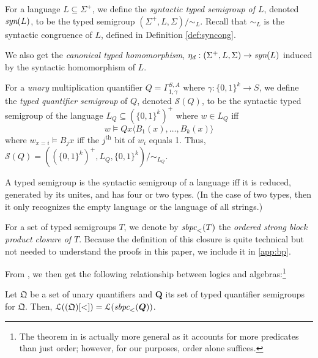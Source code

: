 \documentclass[a4paper,UKenglish,cleveref, autoref, thm-restate, anonymous]{lipics-v2021}
\begin{document}
\begin{definition}
    For a language $L \subseteq \Sigma^+$, we define the \emph{syntactic typed semigroup of $L$}, denoted $\emph{syn}(L)$, to be the typed semigroup $(\Sigma^+, L, \Sigma)/{\sim_L}$. Recall that ${\sim_L}$ is the syntactic congruence of $L$, defined in Definition \ref{def:syncong}.

    We also get the \emph{canonical typed homomorphism}, $\eta_d : (\Sigma^+, L, \Sigma) \rightarrow \emph{syn}(L)$ induced by the syntactic homomorphism of $L$.
\end{definition} 


\begin{definition}\label{def:origtypedquantsemi}
    For a \emph{unary} multiplication quantifier $Q = \Gamma^{S,A}_{1,\gamma}$ where $\gamma : \{0,1\}^k \rightarrow S$, we define the \emph{typed quantifier semigroup} of $Q$, denoted $\mathcal{S}(Q)$, to be the syntactic typed semigroup of the language $L_Q \subseteq (\{0,1\}^k)^+$ where $w \in L_Q$ iff \[
        w \models Q x \langle B_1(x), \dots, B_k(x) \rangle
    \] where $w_{x=i} \models B_jx$ iff the $j^{\text{th}}$ bit of $w_i$ equals 1. Thus, $\mathcal{S}(Q) = ((\{0,1\}^k)^+, L_Q, \{0,1\}^k) / {\sim_{L_Q}}$.
\end{definition}

\begin{proposition}
    A typed semigroup is the syntactic semigroup of a language iff it is reduced, generated by its unites, and has four or two types. (In the case of two types, then it only recognizes the empty language or the language of all strings.)
\end{proposition}

\begin{definition}
    For a set of typed semigroups $T$, we denote by $\emph{sbpc}_<(T)$ the \emph{ordered strong block product closure of $T$}. Because the definition of this closure is quite technical but not needed to understand the proofs in this paper, we include it in \autoref{app:bp}.
\end{definition}

From \cite[Theorem 4.14]{krebs2008typed}, we then get the following relationship between logics and algebras:\footnote{The theorem in \cite{krebs2008typed} is actually more general as it accounts for more predicates than just order; however, for our purposes, order alone suffices.}
\begin{theorem}\label{thm:logcircalgequiv}
    Let $\mathfrak{Q}$ be a set of unary quantifiers and $\bm{Q}$ its set of typed quantifier semigroups for $\mathfrak{Q}$. Then, \(
        \mathcal{L}((\mathfrak{Q})[<]) = \mathcal{L}(\emph{sbpc}_<(\bm{Q}))
    \).
\end{theorem}
\iffalse
TODO: remove comments before submission if not needed
Then, via \cite[Corollary 5.13]{krebs2008typed}, we obtain an algebraic characterization of \textsc{DLogTime}-uniform TC${}^0$:
\begin{corollary}\label{cor:algfortc0}
    \(\textsc{DLogTime}\emph{-uniform}\ \emph{TC}^0 = \mathcal{L}(\emph{sbpc}_<(\{(\mathbb{Z}, \mathbb{Z}^+, \pm 1), (\mathbb{N}, \mathbb{S}, \{0,1\})\}))\)
\end{corollary}
\fi
\end{document}
